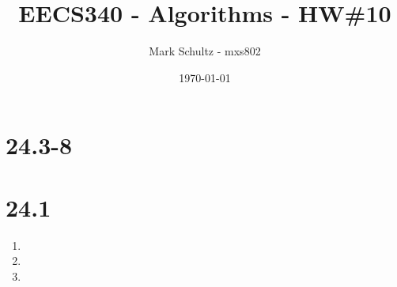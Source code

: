 \documentclass[11pt]{article}
\begin{document}
\title{EECS340 - Algorithms - HW\#10}
\date{\today}
\author{Mark Schultz - mxs802}
\maketitle
\vspace{1.5in}
\section*{24.3-8}

\section*{24.1}
\begin{enumerate}
\item 
\item 
\item 
\end{enumerate}
\end{document}
